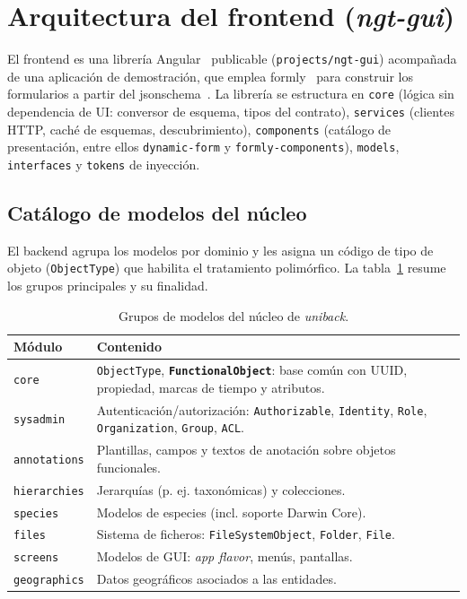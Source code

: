 \section{Arquitectura del frontend (\emph{ngt-gui})}
El frontend es una librería Angular~\cite{angular} publicable
(\texttt{projects/ngt-gui}) acompañada de una aplicación de demostración, que
emplea \gls{formly}~\cite{formly} para construir los formularios a partir del
\gls{jsonschema}~\cite{jsonschema}. La librería se estructura en
\texttt{core} (lógica sin dependencia de UI: conversor de esquema, tipos del
contrato), \texttt{services} (clientes HTTP, caché de esquemas,
descubrimiento), \texttt{components} (catálogo de presentación, entre ellos
\texttt{dynamic-form} y \texttt{formly-components}), \texttt{models},
\texttt{interfaces} y \texttt{tokens} de inyección.

\subsection{Catálogo de modelos del núcleo}
El backend agrupa los modelos por dominio y les asigna un código de tipo de
objeto (\texttt{ObjectType}) que habilita el tratamiento polimórfico. La
tabla~\ref{tab:modelos} resume los grupos principales y su finalidad.

\begin{table}[!htbp]
\caption{Grupos de modelos del núcleo de \emph{uniback}.}
\label{tab:modelos}
\centering
\begin{tabular}{|l|p{8.5cm}|}
\hline
\textbf{Módulo} & \textbf{Contenido} \\ \hline
\texttt{core} & \texttt{ObjectType}, \texttt{\textbf{FunctionalObject}}: base común
con UUID, propiedad, marcas de tiempo y atributos. \\ \hline
\texttt{sysadmin} & Autenticación/autorización: \texttt{Authorizable},
\texttt{Identity}, \texttt{Role}, \texttt{Organization}, \texttt{Group},
\texttt{ACL}. \\ \hline
\texttt{annotations} & Plantillas, campos y textos de anotación sobre objetos
funcionales. \\ \hline
\texttt{hierarchies} & Jerarquías (p. ej. taxonómicas) y colecciones. \\ \hline
\texttt{species} & Modelos de especies (incl. soporte Darwin Core). \\ \hline
\texttt{files} & Sistema de ficheros: \texttt{FileSystemObject},
\texttt{Folder}, \texttt{File}. \\ \hline
\texttt{screens} & Modelos de GUI: \emph{app flavor}, menús, pantallas. \\ \hline
\texttt{geographics} & Datos geográficos asociados a las entidades. \\ \hline
\end{tabular}
\end{table}

